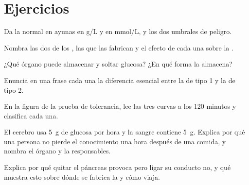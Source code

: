 \section{Ejercicios}

\begin{exercise}[$\star$]\label{exo:g12:glucose-and-diabetes:1}
Da la  normal en ayunas en \unit{g/L} y en \unit{mmol/L}, y los
dos umbrales de peligro.
\end{exercise}

\begin{exercise}[$\star$]\label{exo:g12:glucose-and-diabetes:2}
Nombra las dos  de los , las  que las fabrican y
el efecto de cada una sobre la .
\end{exercise}

\begin{exercise}[$\star$]\label{exo:g12:glucose-and-diabetes:3}
¿Qué órgano puede almacenar y soltar glucosa? ¿En qué forma la
almacena?
\end{exercise}

\begin{exercise}[$\star$]\label{exo:g12:glucose-and-diabetes:4}
Enuncia en una frase cada una la diferencia esencial entre la 
de tipo 1 y la de tipo 2.
\end{exercise}

\begin{exercise}[$\star$]\label{exo:g12:glucose-and-diabetes:5}
En la figura de la prueba de tolerancia, lee las tres curvas a los 120
minutos y clasifica cada una.
\end{exercise}

\begin{exercise}[$\star\star$]\label{exo:g12:glucose-and-diabetes:6}
El cerebro usa \qty{5}{g} de glucosa por hora y la sangre contiene
\qty{5}{g}. Explica por qué una persona no pierde el conocimiento una
hora después de una comida, y nombra el órgano y la 
responsables.
\end{exercise}

\begin{exercise}[$\star\star$]\label{exo:g12:glucose-and-diabetes:7}
Explica por qué quitar el páncreas provoca  pero ligar su
conducto no, y qué muestra esto sobre dónde se fabrica la  y
cómo viaja.
\end{exercise}

